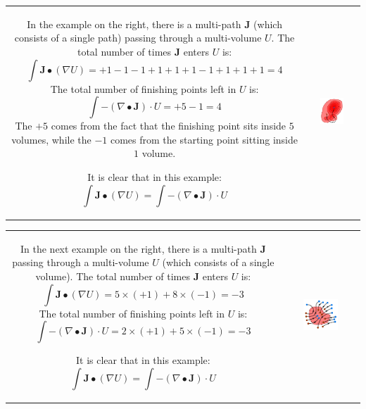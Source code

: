 \begin{tabular}{cc}
\parbox{0.5\textwidth}{
In the example on the right, there is a multi-path \(\mathbf{J}\) (which consists of a single path) passing through a multi-volume \(U\). The total number of times \(\mathbf{J}\) enters \(U\) is: 
\[\int \mathbf{J} \bullet (\nabla U) = +1 - 1 - 1 + 1 + 1 + 1 - 1 + 1 + 1 + 1 = 4\] 
The total number of finishing points left in \(U\) is:
\[\int -(\nabla \bullet \mathbf{J}) \cdot U = +5 - 1 = 4\]
The \(+5\) comes from the fact that the finishing point sits inside \(5\) volumes, while the \(-1\) comes from the starting point sitting inside \(1\) volume.

It is clear that in this example:
 \[\int \mathbf{J} \bullet (\nabla U) = \int -(\nabla \bullet \mathbf{J}) \cdot U\]

} & \parbox{0.5\textwidth}{
\includegraphics[width = 0.5\textwidth]{Boundaries/Path_endpoints/Gradient_theorem}
}
\end{tabular}

\begin{tabular}{cc}
\parbox{0.5\textwidth}{
In the next example on the right, there is a multi-path \(\mathbf{J}\) passing through a multi-volume \(U\) (which consists of a single volume). The total number of times \(\mathbf{J}\) enters \(U\) is: 
\[\int \mathbf{J} \bullet (\nabla U) = 5 \times (+1) + 8 \times (-1) = -3\] 
The total number of finishing points left in \(U\) is:
\[\int -(\nabla \bullet \mathbf{J}) \cdot U = 2 \times (+1) + 5 \times (-1) = -3\]

It is clear that in this example:
 \[\int \mathbf{J} \bullet (\nabla U) = \int -(\nabla \bullet \mathbf{J}) \cdot U\]

} & \parbox{0.5\textwidth}{
\includegraphics[width = 0.5\textwidth]{Boundaries/Path_endpoints/Divergence_theorem}
}
\end{tabular}




